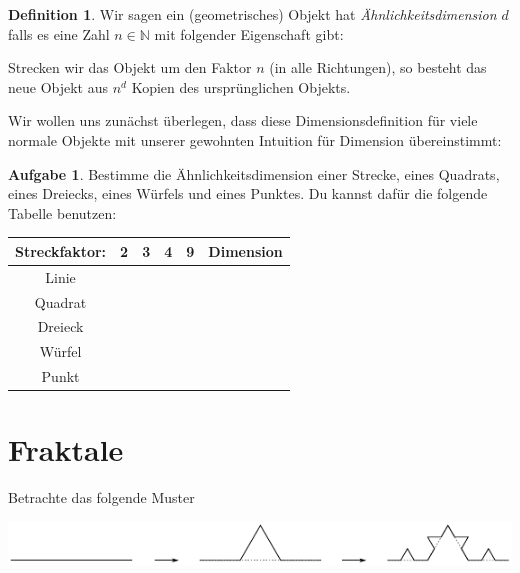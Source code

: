 \documentclass[a4paper,ngerman,12pt]{scrartcl}
\newcommand{\IN}{\mathbb{N}}
\theoremstyle{definition}
\newtheorem{defn}{Definition}[]
\newtheorem{aufg}{Aufgabe}
\theoremstyle{plain}
\theoremstyle{remark}
\begin{document}
\begin{defn}
	Wir sagen ein (geometrisches) Objekt hat \emph{Ähnlichkeitsdimension $d$} falls es eine Zahl $n \in \IN$ mit folgender Eigenschaft gibt:
	
	Strecken wir das Objekt um den Faktor $n$ (in alle Richtungen), so besteht das neue Objekt aus $n^d$ Kopien des ursprünglichen Objekts.
\end{defn}

Wir wollen uns zunächst überlegen, dass diese Dimensionsdefinition für viele \glqq normale\grqq{} Objekte mit unserer gewohnten Intuition für Dimension übereinstimmt:

\begin{aufg}
	Bestimme die Ähnlichkeitsdimension einer Strecke, eines Quadrats, eines Dreiecks, eines Würfels und eines Punktes. Du kannst dafür die folgende Tabelle benutzen:
	\begin{center}\renewcommand{\arraystretch}{2}
		\begin{tabular}{c||c|c|c|c||c}
			Streckfaktor: & \hspace{2em}2\hspace{2em} & \hspace{2em}3\hspace{2em} & \hspace{2em}4\hspace{2em} & \hspace{2em}9\hspace{2em} & Dimension\\\hline
			Linie & & & & & \\
			Quadrat & & & & & \\
			Dreieck & & & & & \\
			Würfel & & & & & \\
			Punkt & & & & & 
		\end{tabular}
	\end{center}
\end{aufg}

\section{Fraktale}

Betrachte das folgende Muster

\begin{center}
	\includegraphics[width=.9\textwidth]{Bilder/Schneeflocke-Konstruktion1.pdf}
\end{center}
\end{document}
